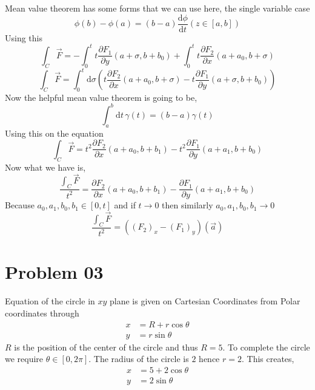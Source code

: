 \documentclass[letter]{article}
\begin{document}
Mean value theorem has some forms that we can use here, the single variable case
\[
	\phi(b) - \phi(a) = (b-a) \frac{\mathrm{d} \phi}{\mathrm{d} t} \left(z \in [a,b]\right)
\]
Using this 
\[
\int_C \vec{F}= 
- 
\int_{0}^{t} t \frac{\partial F_1}{\partial y} (a+\sigma, b+ b_0)  + 
\int_{0}^{t} t \frac{\partial F_2}{\partial x} (a+a_0, b+\sigma ) 
\]
\[
\int_C \vec{F} = \int_{0}^{t} \mathrm{d} \sigma \left(
t \frac{\partial F_2}{\partial x} (a+a_0, b+ \sigma) - t \frac{\partial F_1}{\partial y} (a+\sigma, b+b_0)
\right) \] 
Now the helpful mean value theorem is going to be,
\[
	\int_a^b \mathrm{d} t \, \gamma(t) = (b-a) \gamma(t) 
\]
Using this on the equation
\[
\int_C \vec{F} = 
t^2 \frac{\partial F_2}{\partial x} (a+a_0, b+b_1) - t^2 \frac{\partial F_1}{\partial y} (a+a_1, b+b_0)
\]
Now what we have is, 
\[
\frac{\int_C \vec{F}}{ t^2} = \frac{\partial F_2}{\partial x} (a+a_0, b+b_1) - \frac{\partial F_1}{\partial y} (a+a_1, b+b_0)
\]
Because $a_0, a_1, b_0, b_1 \in [0,t]$ and if $t \to 0$ then similarly $a_0, a_1, b_0, b_1 \to 0$
\[
	\frac{\int_C \vec{F}}{t^2 } = (\left(F_2\right)_x - \left(F_1\right)_y )(\vec{a})
\] 

\begin{comment} 
Mean value theorem says 
\[
\omega(b) - \omega(a) = (b-a) \cdot \omega'(c)
\] 
\[
\int_{0}^{t} F_1(a + \sigma, b) \mathrm{d} \sigma  =  t F_1(a+c_1,b)
\]
\[
\int_{0}^{t} F_2(a+t,b+\sigma) \mathrm{d} \sigma = t F_2(a+t, b+d_1)   
\] 
\[
\int_{0}^{t}  F_1 (a+t-\sigma, b+t) \mathrm{d} \sigma = t  F_1  (a+ t - c_2 , b+t) 
\]
\[
\int_{0}^{t} F_2 (a, b+t-\sigma) \mathrm{d} \sigma = t F_2 (a, b+t - d_2)  
\] 
The path integral hence is,
\[
\frac{1}{t}\int_C \vec{F} =  
F_1(a+c_1, b)- F_1(a+t-c_2 , b+t) + F_2(a+t, b+d_1) - F_2(a, b+t - d_2 )
\]


\[
= \left(\frac{\partial F_1}{\partial x} , \frac{\partial F_1}{\partial y}\right) (\vec{z}) \cdot  (a+c_1 - a - t + c_2, b - b - t) = 
 -\left(\frac{\partial F_1}{\partial x} , \frac{\partial F_1}{\partial y}\right) (\vec{z}) \cdot  (t - (c_1 + c_2), t) + \left(
\frac{\partial F_2}{\partial x}, 
\frac{\partial F_2}{\partial y} 
 \right) (\vec{z}) (t, (d_1 + d_2) - t) =  
\] 

\[
f(\vec{b}) - f(\vec{a}) = \nabla f(\vec{z}) \cdot (\vec{b}-\vec{a})
\] 
\end{comment} 


\newpage
\section*{Problem 03} 
Equation of the circle in $xy$ plane is given on Cartesian Coordinates from Polar coordinates through
 \begin{align*}
	x &= R + r \cos \theta \\
	y &= r \sin \theta 
\end{align*}
$R$ is the position of the center of the circle and thus $ R = 5$. To complete the circle we require $\theta \in [ 0 , 2 \pi] $. The radius of the circle is $2$ hence $r = 2$. This creates, 
\begin{align*}
	x &= 5 + 2 \cos \theta \\
	y &= 2 \sin \theta 
\end{align*}
\end{document}
